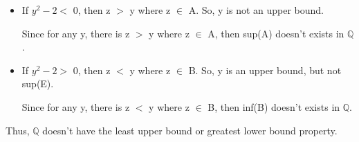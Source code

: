 	\begin{itemize}[leftmargin=1cm, itemsep=0.4em]
		\item If $ y^2-2 < $ 0, then z $>$ y where z $\in$ A.
			So, y is not an upper bound.

			Since for any y, there is z $>$ y where z $\in$ A, then sup(A) doesn't
			exists in $\mathbb{Q}$.
	
		\item If $ y^2-2 > $ 0, then z $<$ y where z $\in$ B.
			So, y is an upper bound, but not sup(E).

			Since for any y, there is z $<$ y where z $\in$ B, then inf(B) doesn't
			exists in $\mathbb{Q}$.
	\end{itemize}

	Thus, $\mathbb{Q}$ doesn't have the least upper bound or greatest lower bound property.


